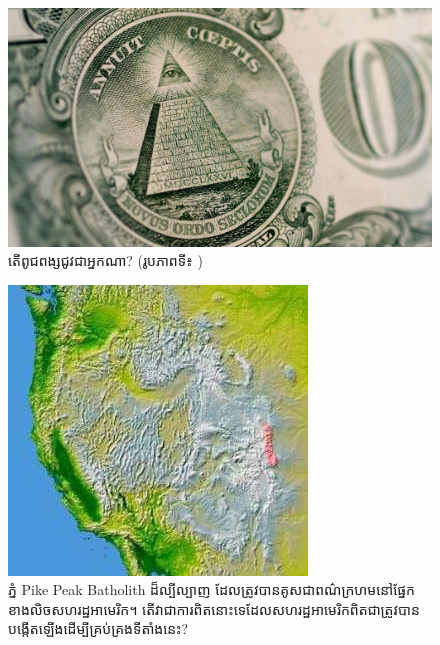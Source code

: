 \documentclass[10pt,twocolumn,letterpaper]{article}
\begin{document}
\begin{figure}[t]
\begin{center}
   \includegraphics[width=1\linewidth]{illuminati.jpg}
\end{center}
   \caption{តើពូជពង្សជូវជាអ្នកណា? (រូបភាពទី៖ \cite{35})}
\label{fig:10}
\label{fig:onecol}
\end{figure}

\begin{figure}[t]
\begin{center}
   \includegraphics[width=1\linewidth]{pike.jpg}
\end{center}
   \caption{ភ្នំ Pike Peak Batholith ដ៏ល្បីល្បាញ ដែលត្រូវបានគូសជាពណ៌ក្រហមនៅផ្នែកខាងលិចសហរដ្ឋអាមេរិក\cite{36}។ តើវាជាការពិតនោះទេដែលសហរដ្ឋអាមេរិកពិតជាត្រូវបានបង្កើតឡើងដើម្បីគ្រប់គ្រងទីតាំងនេះ?}
\label{fig:11}
\label{fig:onecol}
\end{figure}
\end{document}
